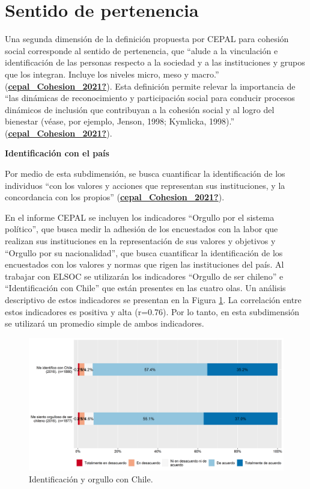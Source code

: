 \documentclass[
  12pt,
]{book}
\begin{document}
\hypertarget{sentido-de-pertenencia}{%
\section{Sentido de pertenencia}\label{sentido-de-pertenencia}}

Una segunda dimensión de la definición propuesta por CEPAL para cohesión social corresponde al sentido de pertenencia, que ``alude a la vinculación e identificación de las personas respecto a la sociedad y a las instituciones y grupos que los integran. Incluye los niveles micro, meso y macro.'' (\protect\hyperlink{ref-cepal_Cohesion_2021}{\textbf{cepal\_Cohesion\_2021?}}). Esta definición permite relevar la importancia de ``las dinámicas de reconocimiento y participación social para conducir procesos dinámicos de inclusión que contribuyan a la cohesión social y al logro del bienestar (véase, por ejemplo, Jenson, 1998; Kymlicka, 1998).'' (\protect\hyperlink{ref-cepal_Cohesion_2021}{\textbf{cepal\_Cohesion\_2021?}}).

\textbf{Identificación con el país}

Por medio de esta subdimensión, se busca cuantificar la identificación de los individuos ``con los valores y acciones que representan sus instituciones, y la concordancia con los propios'' (\protect\hyperlink{ref-cepal_Cohesion_2021}{\textbf{cepal\_Cohesion\_2021?}}).

En el informe CEPAL se incluyen los indicadores ``Orgullo por el sistema político'', que busca medir la adhesión de los encuestados con la labor que realizan sus instituciones en la representación de sus valores y objetivos y ``Orgullo por su nacionalidad'', que busca cuantificar la identificación de los encuestados con los valores y normas que rigen las instituciones del país. Al trabajar con ELSOC se utilizarán los indicadores ``Orgullo de ser chileno'' e ``Identificación con Chile'' que están presentes en las cuatro olas. Un análisis descriptivo de estos indicadores se presentan en la Figura \ref{fig:identificacion}. La correlación entre estos indicadores es positiva y alta (r=0.76). Por lo tanto, en esta subdimensión se utilizará un promedio simple de ambos indicadores.

\begin{figure}[H]

{\centering \includegraphics[width=1\linewidth,height=1\textheight]{output/graphs/identificacion} 

}

\caption{Identificación y orgullo con Chile.}\label{fig:identificacion}
\end{figure}
\end{document}
